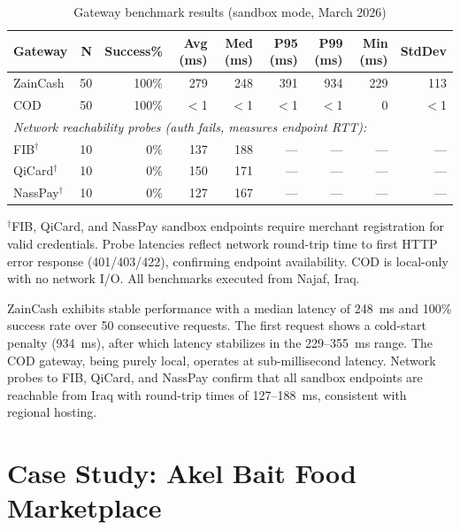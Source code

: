 \documentclass[preprint,12pt]{elsarticle}
\begin{document}
\begin{table}[!t]
\centering
\caption{Gateway benchmark results (sandbox mode, March 2026)}
\label{tab:benchmark-results}
\small
\begin{tabular}{@{}lrrrrrrrr@{}}
\toprule
\textbf{Gateway} & \textbf{N} & \textbf{Success\%} & \textbf{Avg (ms)} & \textbf{Med (ms)} & \textbf{P95 (ms)} & \textbf{P99 (ms)} & \textbf{Min (ms)} & \textbf{StdDev} \\
\midrule
ZainCash & 50 & 100\% & 279 & 248 & 391 & 934 & 229 & 113 \\
COD      & 50 & 100\% & $<$1 & $<$1 & $<$1 & $<$1 & 0 & $<$1 \\
\midrule
\multicolumn{9}{l}{\textit{Network reachability probes (auth fails, measures endpoint RTT):}} \\
FIB$^\dagger$      & 10 & 0\% & 137 & 188 & --- & --- & --- & --- \\
QiCard$^\dagger$   & 10 & 0\% & 150 & 171 & --- & --- & --- & --- \\
NassPay$^\dagger$  & 10 & 0\% & 127 & 167 & --- & --- & --- & --- \\
\bottomrule
\end{tabular}
\vspace{4pt}
\raggedright\small $^\dagger$FIB, QiCard, and NassPay sandbox endpoints require merchant registration for valid credentials. Probe latencies reflect network round-trip time to first HTTP error response (401/403/422), confirming endpoint availability. COD is local-only with no network I/O. All benchmarks executed from Najaf, Iraq.
\end{table}

ZainCash exhibits stable performance with a median latency of 248~ms and 100\% success rate over 50 consecutive requests. The first request shows a cold-start penalty (934~ms), after which latency stabilizes in the 229--355~ms range. The COD gateway, being purely local, operates at sub-millisecond latency. Network probes to FIB, QiCard, and NassPay confirm that all sandbox endpoints are reachable from Iraq with round-trip times of 127--188~ms, consistent with regional hosting.

\section{Case Study: Akel Bait Food Marketplace}
\label{sec:casestudy}
\end{document}
